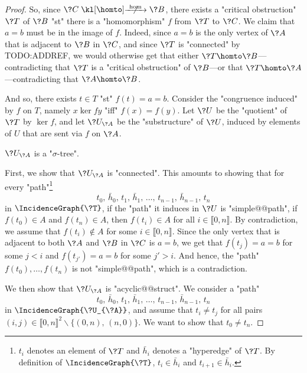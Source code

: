 \begin{proof}
	So, since $\?C \nothomto \?B$, there exists a "critical obstruction" $\?T$ of $\?B$
	"st" there is a "homomorphism" $f$ from $\?T$ to $\?C$. 
	We claim that $a=b$ must be in the image of $f$. Indeed, since $a=b$ is the only vertex
	of $\?A$ that is adjacent to $\?B$ in $\?C$, and since $\?T$ is "connected" by TODO:ADDREF,
	we would otherwise get that either $\?T \homto \?B$---contradicting that $\?T$ is a "critical obstruction" of $\?B$---or that $\?T \homto \?A$---contradicting that $\?A \homto \?B$.
	
	And so, there exists $t \in T$ "st" $f(t) = a = b$.
	Consider the "congruence induced" by $f$ on $T$, namely $x \ker{f} y$ "iff"
	$f(x) = f(y)$. Let $\?U$ be the "quotient" of $\?T$ by $\ker{f}$,
	and let $\?U_{\?A}$ be the "substructure" of $\?U$, induced by elements
	of $U$ that are sent via $f$ on $\?A$.
	\begin{claim}
		\AP\label{claim:hyperedge-consistency-uniform-convergence-trees-are-trees}
		$\?U_{\?A}$ is a "$\sigma$-tree".
	\end{claim}
	First, we show that $\?U_{\?A}$ is "connected". This amounts to showing that for
	every "path"\footnote{$t_i$ denotes an element of $\?T$ and $\bar h_i$ denotes a "hyperedge" of $\?T$. By definition of $\IncidenceGraph{\?T}$, $t_i \in \bar h_i$ and
	$t_{i+1} \in \bar h_i$.}
	\[
		t_0,\, \bar h_0,\, t_1,\, \bar h_1,\, \hdots,\, t_{n-1},\, \bar h_{n-1},\, t_n
	\]
	in $\IncidenceGraph{\?T}$, if the "path" it induces in $\?U$ is "simple@@path",
	if $f(t_0) \in A$ and $f(t_n) \in A$,
	then $f(t_i) \in A$ for all $i \in \lBrack 0,n \rBrack$.
	By contradiction, we assume that $f(t_i) \not\in A$ for some $i \in \lBrack 0,n \rBrack$.
	Since the only vertex that is adjacent to both $\?A$ and $\?B$ in $\?C$ is $a=b$,
	we get that $f(t_j) = a = b$ for some $j < i$ and $f(t_{j'}) = a = b$ for some $j' > i$.
	And hence, the "path" $f(t_0), \hdots, f(t_n)$ is not "simple@@path", which is a contradiction.

	We then show that $\?U_{\?A}$ is "acyclic@@struct". We consider a "path"
	\[
		t_0,\, \bar h_0,\, t_1,\, \bar h_1,\, \hdots,\, t_{n-1},\, \bar h_{n-1},\, t_n
	\]
	in $\IncidenceGraph{\?U_{\?A}}$, and assume that $t_i \neq t_j$ for all pairs
	$(i,j) \in \lBrack 0,n\rBrack^2 \smallsetminus \{(0,n),\, (n,0)\}$.
	We want to show that $t_0 \neq t_n$.
		


\end{proof}
